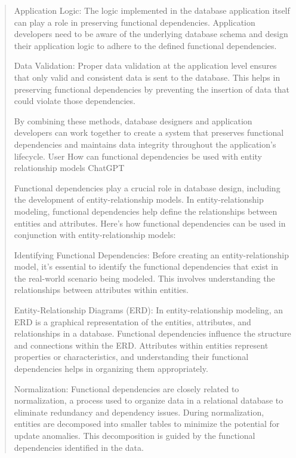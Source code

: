 \documentclass[11pt]{article}
\begin{document}
\begin{enumerate}
\begin{quotation}
    Application Logic:
        The logic implemented in the database application itself can play a role in preserving functional dependencies. Application developers need to be aware of the underlying database schema and design their application logic to adhere to the defined functional dependencies.

    Data Validation:
        Proper data validation at the application level ensures that only valid and consistent data is sent to the database. This helps in preserving functional dependencies by preventing the insertion of data that could violate those dependencies.

By combining these methods, database designers and application developers can work together to create a system that preserves functional dependencies and maintains data integrity throughout the application's lifecycle.
User
How can functional dependencies be used with entity relationship models
ChatGPT

Functional dependencies play a crucial role in database design, including the development of entity-relationship models. In entity-relationship modeling, functional dependencies help define the relationships between entities and attributes. Here's how functional dependencies can be used in conjunction with entity-relationship models:

    Identifying Functional Dependencies:
        Before creating an entity-relationship model, it's essential to identify the functional dependencies that exist in the real-world scenario being modeled. This involves understanding the relationships between attributes within entities.

    Entity-Relationship Diagrams (ERD):
        In entity-relationship modeling, an ERD is a graphical representation of the entities, attributes, and relationships in a database. Functional dependencies influence the structure and connections within the ERD.
        Attributes within entities represent properties or characteristics, and understanding their functional dependencies helps in organizing them appropriately.

    Normalization:
        Functional dependencies are closely related to normalization, a process used to organize data in a relational database to eliminate redundancy and dependency issues.
        During normalization, entities are decomposed into smaller tables to minimize the potential for update anomalies. This decomposition is guided by the functional dependencies identified in the data.


\end{quotation}
\end{enumerate}
\end{document}
